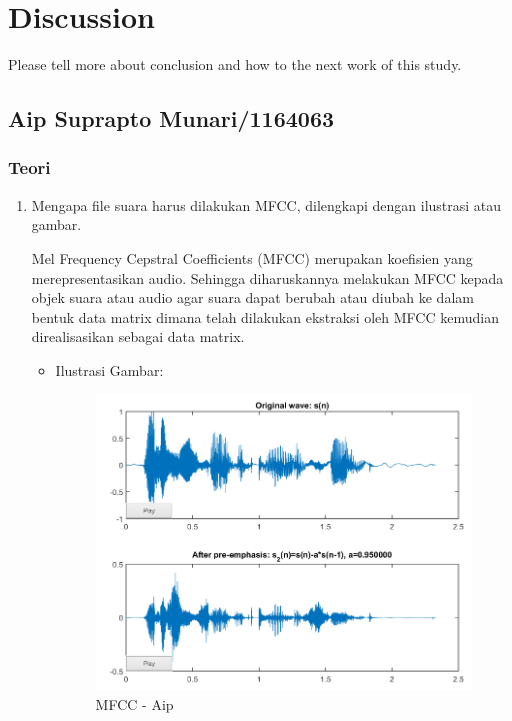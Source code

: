 \chapter{Discussion}
Please tell more about conclusion and how to the next work of this study.

\section{Aip Suprapto Munari/1164063}
\subsection{Teori}
\begin{enumerate}
\item Mengapa file suara harus dilakukan MFCC, dilengkapi dengan ilustrasi atau gambar.

Mel Frequency Cepstral Coefficients (MFCC) merupakan koefisien yang merepresentasikan audio. Sehingga diharuskannya melakukan MFCC kepada objek suara atau audio agar suara dapat berubah atau diubah ke dalam bentuk data matrix dimana telah dilakukan ekstraksi oleh MFCC kemudian direalisasikan sebagai data matrix.

\begin{itemize}
\item Ilustrasi Gambar:

\begin{figure}[!hbtp]
\centering
\includegraphics[scale=0.7]{figures/AIP/f1.PNG}
\caption{MFCC - Aip}
\label{MFCC - Aip}
\end{figure}


\end{itemize}
\end{enumerate}

